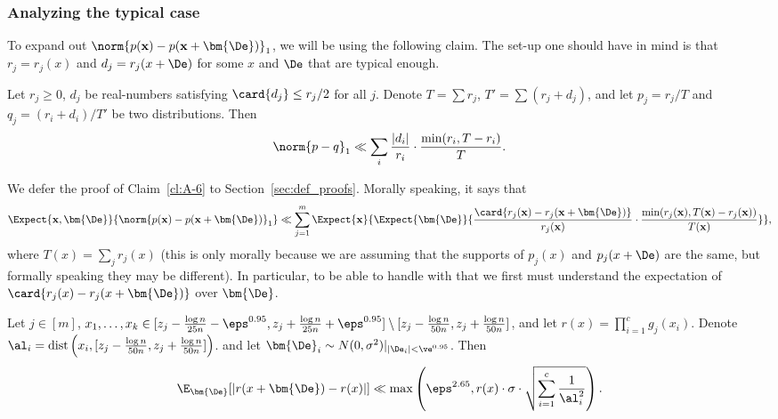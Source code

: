 \subsubsection{Analyzing the typical case}
To expand out $\norm{p({\bf x}) - p({\bf x}+\bm{\De})}_1$, we will be using the following claim. The set-up one should
have in mind is that $r_j = r_j(x)$ and $d_j = r_j(x+\De)$ for some $x$ and $\De$ that are typical enough.
\begin{claim} \label{cl:A-6}
	Let $r_j\geq 0$, $d_j$ be real-numbers satisfying $\card{d_j}\leq r_j/2$ for all $j$.
    Denote $T=\sum r_j$, $T'=\sum (r_j+d_j)$, and let $p_j = r_j/T$ and $q_j = (r_i+d_i)/T'$ be two distributions.
    Then
	\begin{equation}\label{eq:cl:A-6:0}
	\norm{p-q}_1 \ll \sum_i \frac{|d_i|}{r_i} \cdot \frac{\min(r_i, T-r_i)}{T}.
	\end{equation}
\end{claim}
We defer the proof of Claim~\ref{cl:A-6} to Section~\ref{sec:def_proofs}. Morally speaking, it says that
\begin{equation}\label{eq:pretend1}
\Expect{{\bf x},\bm{\De}}{\norm{p({\bf x}) - p({\bf x}+\bm{\De})}_1}
\ll \sum\limits_{j=1}^{m}{\Expect{{\bf x}}{\Expect{\bm{\De}}{\frac{\card{r_j({\bf x}) - r_j({\bf x}+\bm{\De})}}{r_j({\bf x})}\cdot\frac{\min(r_j({\bf x}),T({\bf x})-r_j({\bf x}))}{T({\bf x})}}}},
\end{equation}
where $T(x) = \sum\limits_{j}{r_j(x)}$ (this is only morally because we are assuming that the supports of $p_j(x)$ and $p_j(x+\De)$
are the same, but formally speaking they may be different). In particular, to be able to handle with that we first must understand
the expectation of $\card{r_j(x) - r_j(x+\bm{\De})}$ over $\bm{\De}$.
\begin{claim}\label{cl:A-4}
    Let $j\in [m]$,  $x_1,\ldots,x_k \in [z_j-\frac{\log n}{25 n}-\eps^{0.95},z_j+\frac{\log n}{25 n}+\eps^{0.95}] \setminus [z_j-\frac{\log n}{50 n},z_j+\frac{\log n}{50 n}]$,
    and let $r(x)=\prod_{i=1}^c g_j(x_i)$.
	Denote $\al_i =\text{dist}\left(x_i, [z_j-\frac{\log n}{50n},z_j+\frac{\log n}{50n}]\right)$.
	and let $\bm{\De}_i \sim N(0,\sigma^2)|_{|\De_i|<\ve^{0.95}}$.
	Then
	\begin{equation}
	\E_{\bm{\De}}[|r(x+\bm{\De})-r(x)|] \ll \max\left(\eps^{2.65},r(x)\cdot \sigma\cdot\sqrt{\sum_{i=1}^c \frac{1}{\al_i^2}}\right).
	\end{equation}
\end{claim}

